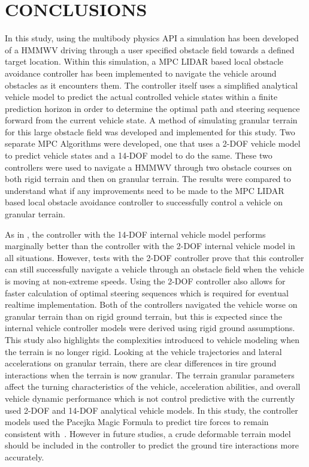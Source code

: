 \documentclass[12pt,twocolumn]{article}
\newcommand{\CHRONO}{{\sffamily{{Chrono}}}}
\begin{document}

\section{CONCLUSIONS}\label{s:conclusion}

In this study, using the multibody physics API {\CHRONO} a simulation has been developed of a HMMWV driving through a user specified obstacle field towards a defined target location. Within this simulation, a MPC LIDAR based local obstacle avoidance controller has been implemented to navigate the vehicle around obstacles as it encounters them. The controller itself uses a simplified analytical vehicle model to predict the actual controlled {\CHRONO} vehicle states within a finite prediction horizon in order to determine the optimal path and steering sequence forward from the current vehicle state. A method of simulating granular terrain for this large obstacle field was developed and implemented for this study. Two separate MPC Algorithms were developed, one that uses a 2-DOF vehicle model to predict {\CHRONO} vehicle states and a 14-DOF model to do the same. These two controllers were used to navigate a {\CHRONO} HMMWV through two obstacle courses on both rigid terrain and then on granular terrain. The results were compared to understand what if any improvements need to be made to the MPC LIDAR based local obstacle avoidance controller to successfully control a vehicle on granular terrain. 

As in \cite{ModelFidelity2016}, the controller with the 14-DOF internal vehicle model performs marginally better than the controller with the 2-DOF internal vehicle model in all situations. However, tests with the 2-DOF controller prove that this controller can still successfully navigate a vehicle through an obstacle field when the vehicle is moving at non-extreme speeds. Using the 2-DOF controller also allows for faster calculation of optimal steering sequences which is required for eventual realtime implementation. Both of the controllers navigated the vehicle worse on granular terrain than on rigid ground terrain, but this is expected since the internal vehicle controller models were derived using rigid ground assumptions. This study also highlights the complexities introduced to vehicle modeling when the terrain is no longer rigid. Looking at the vehicle trajectories and lateral accelerations on granular terrain, there are clear differences in tire ground interactions when the terrain is now granular. The terrain granular parameters affect the turning characteristics of the vehicle, acceleration abilities, and overall vehicle dynamic performance which is not control predictive with the currently used 2-DOF and 14-DOF analytical vehicle models. In this study, the controller models used the Pacejka Magic Formula to predict tire forces to remain consistent with~\cite{ModelFidelity2016}. However in future studies, a crude deformable terrain model should be included in the controller to predict the ground tire interactions more accurately.
\end{document}
